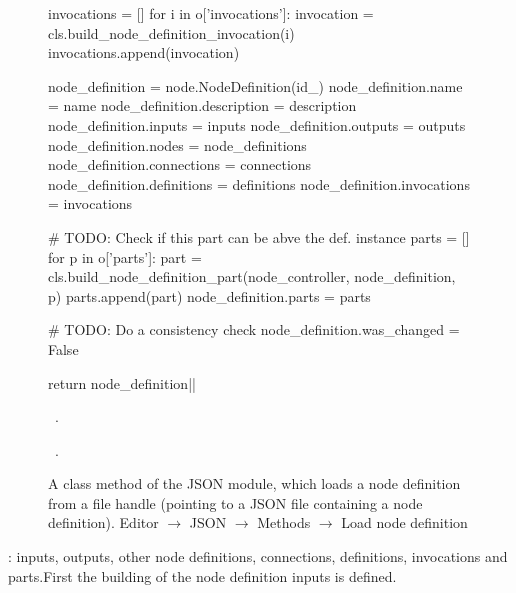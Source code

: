 \documentclass[%
    a4paper,    %
    justified,  %
    nobib,      %
    openany     %
]{tufte-book}
\begin{document}
\begin{figure}
\begin{flushleft}
\begin{minipage}{\linewidth}
\begin{pythoncode}
    invocations = []
    for i in o['invocations']:
        invocation = cls.build_node_definition_invocation(i)
        invocations.append(invocation)

    node_definition             = node.NodeDefinition(id_)
    node_definition.name        = name
    node_definition.description = description
    node_definition.inputs      = inputs
    node_definition.outputs     = outputs
    node_definition.nodes       = node_definitions
    node_definition.connections = connections
    node_definition.definitions = definitions
    node_definition.invocations = invocations

    # TODO: Check if this part can be abve the def. instance
    parts = []
    for p in o['parts']:
        part = cls.build_node_definition_part(node_controller, node_definition, p)
        parts.append(part)
    node_definition.parts = parts

    # TODO: Do a consistency check
    node_definition.was_changed = False

    return node_definition|\NWsep|
\end{pythoncode}
\vspace{1.5ex}
\footnotesize
\begin{list}{}{\setlength{\itemsep}{-\parsep}\setlength{\itemindent}{-\leftmargin}}
\item \NWtxtMacroDefBy\ .
\item \NWtxtMacroRefIn\ .

\item{}
\end{list}
\end{minipage}\vspace{4ex}
\end{flushleft}
\caption{A class method of the JSON module, which loads a node definition from a
  file handle (pointing to a JSON file containing a node definition).
  \newline{}\newline{}Editor $\rightarrow$ JSON $\rightarrow$
  Methods $\rightarrow$ Load node definition}
\label{editor:lst:json:methods:load-node-definition}
\end{figure}

: inputs, outputs,
other node definitions, connections, definitions, invocations and parts.First
the building of the node definition inputs is defined.
\end{document}
